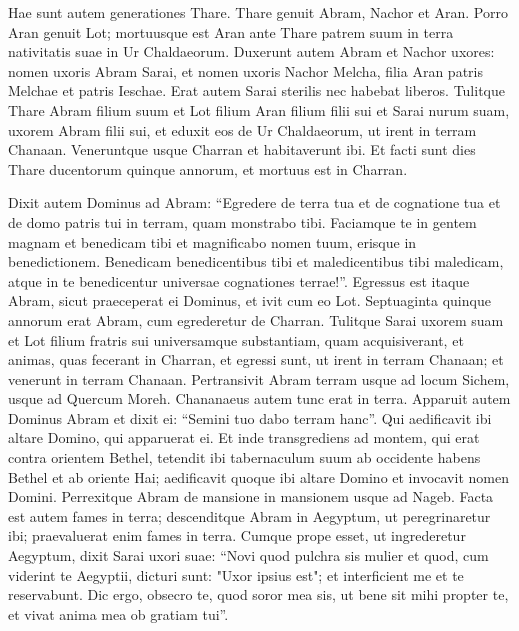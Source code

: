 \begin{biblechapter}
\verse Hae sunt autem generationes Thare. Thare genuit Abram, Nachor et Aran. Porro Aran genuit Lot; 
\verse mortuusque est Aran ante Thare patrem suum in terra nativitatis suae in Ur Chaldaeorum. 
\verse Duxerunt autem Abram et Nachor uxores: nomen uxoris Abram Sarai, et nomen uxoris Nachor Melcha, filia Aran patris Melchae et patris Ieschae. 
\verse Erat autem Sarai sterilis nec habebat liberos. 
\verse Tulitque Thare Abram filium suum et Lot filium Aran filium filii sui et Sarai nurum suam, uxorem Abram filii sui, et eduxit eos de Ur Chaldaeorum, ut irent in terram Chanaan. Veneruntque usque Charran et habitaverunt ibi. 
\verse Et facti sunt dies Thare ducentorum quinque annorum, et mortuus est in Charran. 
\end{biblechapter}

\begin{biblechapter}  
\verse Dixit autem Dominus ad Abram: “Egredere de terra tua et de cognatione tua et de domo patris tui in terram, quam monstrabo tibi. 
\verse Faciamque te in gentem magnam et benedicam tibi et magnificabo nomen tuum, erisque in benedictionem. 
\verse Benedicam benedicentibus tibi et maledicentibus tibi maledicam, atque in te benedicentur universae cognationes terrae!”. 
\verse Egressus est itaque Abram, sicut praeceperat ei Dominus, et ivit cum eo Lot. Septuaginta quinque annorum erat Abram, cum egrederetur de Charran. 
\verse Tulitque Sarai uxorem suam et Lot filium fratris sui universamque substantiam, quam acquisiverant, et animas, quas fecerant in Charran, et egressi sunt, ut irent in terram Chanaan; et venerunt in terram Chanaan. 
\verse Pertransivit Abram terram usque ad locum Sichem, usque ad Quercum Moreh. Chananaeus autem tunc erat in terra. 
\verse Apparuit autem Dominus Abram et dixit ei: “Semini tuo dabo terram hanc”. Qui aedificavit ibi altare Domino, qui apparuerat ei. 
\verse Et inde transgrediens ad montem, qui erat contra orientem Bethel, tetendit ibi tabernaculum suum ab occidente habens Bethel et ab oriente Hai; aedificavit quoque ibi altare Domino et invocavit nomen Domini. 
\verse Perrexitque Abram de mansione in mansionem usque ad Nageb. 
\verse Facta est autem fames in terra; descenditque Abram in Aegyptum, ut peregrinaretur ibi; praevaluerat enim fames in terra. 
\verse Cumque prope esset, ut ingrederetur Aegyptum, dixit Sarai uxori suae: “Novi quod pulchra sis mulier  
\verse et quod, cum viderint te Aegyptii, dicturi sunt: "Uxor ipsius est"; et interficient me et te reservabunt. 
\verse Dic ergo, obsecro te, quod soror mea sis, ut bene sit mihi propter te, et vivat anima mea ob gratiam tui”. 

\end{biblechapter}
